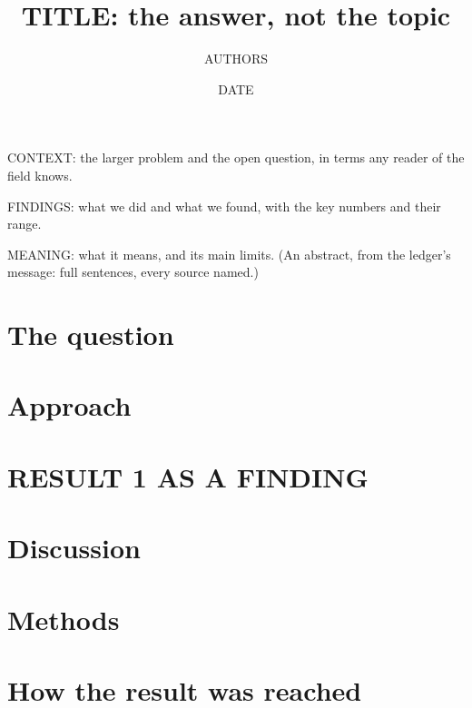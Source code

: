 \documentclass[11pt]{article}
\title{TITLE: the answer, not the topic}
\author{AUTHORS}
\date{DATE}
\begin{document}
\maketitle

\begin{inshort}
CONTEXT: the larger problem and the open question, in terms any reader of the field knows.

\smallskip
FINDINGS: what we did and what we found, with the key numbers and their range.

\smallskip
MEANING: what it means, and its main limits. (An abstract, from the ledger's message: full sentences, every source named.)
\end{inshort}

\section{The question}

\section{Approach}

\section{RESULT 1 AS A FINDING}

\section{Discussion}

\section{Methods}

\printbibliography

\supplementary
\section{How the result was reached}
\end{document}
